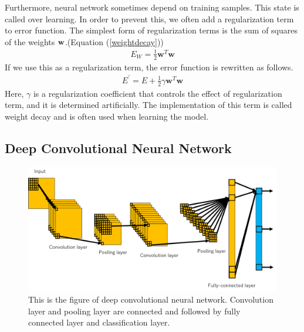 \documentclass[a4paper,12pt]{article}
\begin{document}









Furthermore, neural network sometimes depend on training samples. This state is called over learning. In order to prevent this, we often add a regularization term to error function. The simplest form of regularization terms is the sum of squares of the weights ${\bf w}$.(Equation (\ref{weightdecay}))
\begin{align} \label{weightdecay}
E_W=\frac{1}{2}{\bm w}^T{\bm w}
\end{align}
If we use this as a regularization term, the error function is rewritten as follows.
\begin{align}
E^\prime=E + \frac{1}{2}\gamma{\bm w}^T{\bm w}
\end{align}
Here, $\gamma$ is a regularization coefficient that controls the effect of regularization term, and it is determined artificially. The implementation of this term is called weight decay and is often used when learning the model.

\clearpage
\subsection{Deep Convolutional Neural Network}
\begin{figure}[ht]
\begin{center}
\includegraphics[scale=0.4]{figure8.png}
\caption{This is the figure of deep convolutional neural network. Convolution layer and pooling layer are connected and followed by fully connected layer and classification layer.}
\end{center}
\end{figure}
\end{document}
